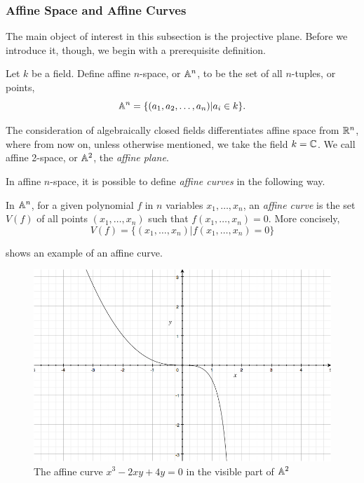 \subsubsection{Affine Space and Affine Curves}
The main object of interest in this subsection is the projective plane.
Before we introduce it, though, we begin with a prerequisite definition.

\begin{definition}
	Let $k$ be a field. Define affine $n$-space, or $\an$, to be the set of all $n$-tuples, or points,
	$$\an = \{ (a_1,a_2,\ldots,a_n) | a_i \in k\}.$$
\end{definition}

The consideration of algebraically closed fields differentiates affine space from $\R^n$, where from now on, unless otherwise mentioned, we take the field $k = \C$.
We call affine 2-space, or $\an[2]$, the \emph{affine plane}.

In affine $n$-space, it is possible to define \emph{affine curves} in the following way.
\begin{definition}
	In $\an$, for a given polynomial $f$ in $n$ variables $x_1,\ldots,x_n$, an \emph{affine curve} is the set $V(f)$ of all points $(x_1,\ldots,x_n)$ such that $f(x_1,\ldots,x_n)=0$. More concisely,
	$$V(f) = \{(x_1,\ldots,x_n) | f(x_1,\ldots,x_n)=0\}$$
\end{definition}
 shows an example of an affine curve.

\begin{figure}[htbp]
	\centering
	\includegraphics[scale=0.3]{../Figures/affineexample.jpg}
	\caption{The affine curve $x^3 - 2xy + 4y = 0$ in the visible part of $\an[2]$}
	\label{affinecurveexample}
\end{figure}

